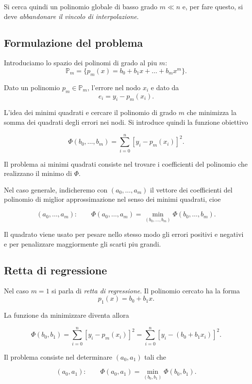 \documentclass[11pt,a4paper]{report}
\begin{document}
Si cerca quindi un polinomio globale di basso grado $m\ll n$ e, per fare questo, si deve \emph{abbandonare il vincolo di interpolazione}.

\subsection{Formulazione del problema}
Introduciamo lo spazio dei polinomi di grado al piu $m$:
\[
\mathbb P_m = \{p_m(x)=b_0+b_1x+\dots+b_mx^m\}.
\]

Dato un polinomio $p_m\in\mathbb P_m$, l'errore nel nodo $x_i$ e dato da
\[
 e_i = y_i - p_m(x_i).
\]

L'idea dei minimi quadrati e cercare il polinomio di grado $m$ che minimizza la somma dei quadrati degli errori nei nodi. Si introduce quindi la funzione obiettivo
\begin{formulaBox}
\[
\Phi(b_0,\dots,b_m)=\sum_{i=0}^n [y_i-p_m(x_i)]^2.
\]
\end{formulaBox}
Il problema ai minimi quadrati consiste nel trovare i coefficienti del polinomio che realizzano il minimo di $\Phi$.

Nel caso generale, indicheremo con $(a_0,\dots,a_m)$ il vettore dei coefficienti del polinomio di miglior approssimazione nel senso dei minimi quadrati, cioe
\begin{formulaBox}
\[
(a_0,\dots,a_m):\qquad \Phi(a_0,\dots,a_m)=\min_{(b_0,\dots,b_m)}\Phi(b_0,\dots,b_m).
\]
\end{formulaBox}

Il quadrato viene usato per pesare nello stesso modo gli errori positivi e negativi e per penalizzare maggiormente gli scarti piu grandi.

\subsection{Retta di regressione}
Nel caso $m=1$ si parla di \emph{retta di regressione}. Il polinomio cercato ha la forma
\[
 p_1(x)=b_0+b_1x.
\]

La funzione da minimizzare diventa allora
\begin{formulaBox}
\[
\Phi(b_0,b_1)=\sum_{i=0}^n [y_i-p_m(x_i)]^2 = \sum_{i=0}^n [y_i-(b_0+b_1x_i)]^2.
\]
\end{formulaBox}

Il problema consiste nel determinare $(a_0,a_1)$ tali che
\begin{formulaBox}
\[
(a_0,a_1):\qquad \Phi(a_0,a_1)=\min_{(b_0,b_1)}\Phi(b_0,b_1).
\]
\end{formulaBox}
\end{document}
